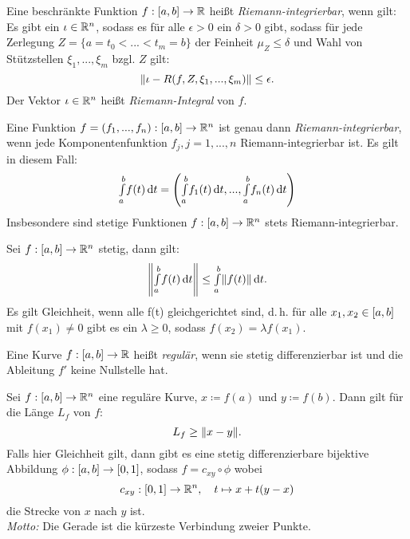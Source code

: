 \documentclass{cheat-sheet}
\begin{document}

\begin{defn} Eine beschränkte Funktion $f : \left[ a, b \right] \to \mathbb{R}$ heißt \emph{Riemann-integrierbar}, wenn gilt: Es gibt ein $\iota \in \mathbb{R}^n$, sodass es für alle $\epsilon > 0$ ein $\delta > 0$ gibt, sodass für jede Zerlegung $Z = \{ a = t_0 < ... < t_m = b \}$ der Feinheit $\mu_Z \le \delta$ und Wahl von Stützstellen $\xi_1, ..., \xi_m$ bzgl. $Z$ gilt:
\[ \lVert\iota - R(f, Z, \xi_1, ..., \xi_m)\rVert \le \epsilon. \]
Der Vektor $\iota \in \mathbb{R}^n$ heißt \emph{Riemann-Integral} von $f$.
\end{defn}

\begin{bem}
  Eine Funktion $f = (f_1, ..., f_n) : \left[ a, b \right] \to \mathbb{R}^n$ ist genau dann \emph{Riemann-integrierbar}, wenn jede Komponentenfunktion $f_j, j = 1, ..., n$ Riemann-integrierbar ist. Es gilt in diesem Fall:
  \[ {\textstyle \int\limits_{a}^{b}} f(t) \,\mathrm{d} t = \left( {\textstyle \int\limits_{a}^{b}} f_1(t) \,\mathrm{d} t, ..., {\textstyle \int\limits_{a}^{b}} f_n(t) \,\mathrm{d} t \right) \]
  Insbesondere sind stetige Funktionen $f : \left[ a, b \right] \to \mathbb{R}^n$ stets Riemann-integrierbar.
\end{bem}

\begin{satz}
  Sei $f : \left[ a, b \right] \to \mathbb{R}^n$ stetig, dann gilt:
  \[ \left\| {\textstyle \int\limits_{a}^{b}} f(t) \,\mathrm{d} t \right\| \le {\textstyle \int\limits_{a}^{b}} \lVert f(t)\rVert \,\mathrm{d} t. \]
  Es gilt Gleichheit, wenn alle f(t) gleichgerichtet sind, d.\,h. für alle $x_1, x_2 \in \left[ a, b \right]$ mit $f(x_1) \not= 0$ gibt es ein $\lambda \ge 0$, sodass $f(x_2) = \lambda f(x_1)$.
\end{satz}

\begin{defn}
Eine Kurve $f : \left[ a, b \right] \to \mathbb{R}$ heißt \emph{regulär}, wenn sie stetig differenzierbar ist und die Ableitung $f'$ keine Nullstelle hat.
\end{defn}

\begin{kor}
Sei $f : \left[ a, b \right] \to \mathbb{R}^n$ eine reguläre Kurve, $x \coloneqq f(a)$ und $y \coloneqq f(b)$. Dann gilt für die Länge $L_f$ von $f$:
\[ L_f \ge \lVert x - y\rVert. \]
Falls hier Gleichheit gilt, dann gibt es eine stetig differenzierbare bijektive Abbildung $\phi : \left[ a, b \right] \to \left[ 0, 1 \right]$, sodass $f = c_{xy} \circ \phi$ wobei
\[ c_{xy} : \left[ 0, 1 \right] \to \mathbb{R}^n,\quad t \mapsto x + t(y - x) \]
die Strecke von $x$ nach $y$ ist.\\
\textit{Motto:} Die Gerade ist die kürzeste Verbindung zweier Punkte.
\end{kor}
\end{document}
